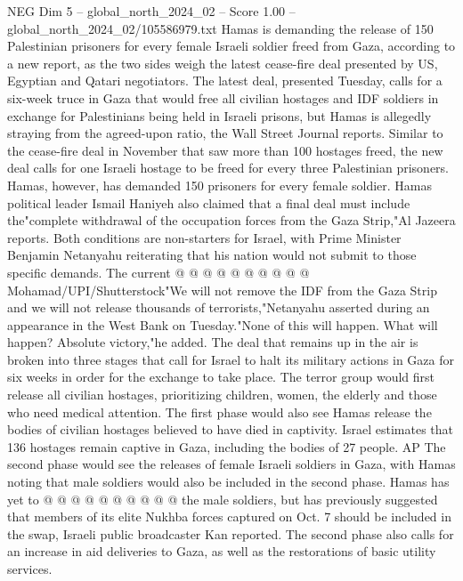 \begin{textsample}{NEG Dim 5 – global\_north\_2024\_02 – Score 1.00 – global\_north\_2024\_02/105586979.txt}  \label{ex:f5_neg_219}
Hamas is demanding the release of 150 Palestinian prisoners for every female Israeli soldier freed from Gaza, according to a new report, as the two sides weigh the latest cease-fire deal presented by US, Egyptian and Qatari negotiators.
The latest deal, presented Tuesday, calls for a six-week truce in Gaza that would free all civilian hostages and IDF soldiers in exchange for Palestinians being held in Israeli prisons, but Hamas is allegedly straying from the agreed-upon ratio, the Wall Street Journal reports.
Similar to the cease-fire deal in November that saw more than 100 hostages freed, the new deal calls for one Israeli hostage to be freed for every three Palestinian prisoners.
Hamas, however, has demanded 150 prisoners for every female soldier.
Hamas political leader Ismail Haniyeh also claimed that a final deal must include the"complete withdrawal of the occupation forces from the Gaza Strip,"Al Jazeera reports.
Both conditions are non-starters for Israel, with Prime Minister Benjamin Netanyahu reiterating that his nation would not submit to those specific demands.
The current @ @ @ @ @ @ @ @ @ @ Mohamad/UPI/Shutterstock"We will not remove the IDF from the Gaza Strip and we will not release thousands of terrorists,"Netanyahu asserted during an appearance in the West Bank on Tuesday."None of this will happen.
What will happen?
Absolute victory,"he added.
The deal that remains up in the air is broken into three stages that call for Israel to halt its military actions in Gaza for six weeks in order for the exchange to take place.
The terror group would first release all civilian hostages, prioritizing children, women, the elderly and those who need medical attention.
The first phase would also see Hamas release the bodies of civilian hostages believed to have died in captivity.
Israel estimates that 136 hostages remain captive in Gaza, including the bodies of 27 people.
AP The second phase would see the releases of female Israeli soldiers in Gaza, with Hamas noting that male soldiers would also be included in the second phase.
Hamas has yet to @ @ @ @ @ @ @ @ @ @ the male soldiers, but has previously suggested that members of its elite Nukhba forces captured on Oct. 7 should be included in the swap, Israeli public broadcaster Kan reported.
The second phase also calls for an increase in aid deliveries to Gaza, as well as the restorations of basic utility services.

\end{textsample}
